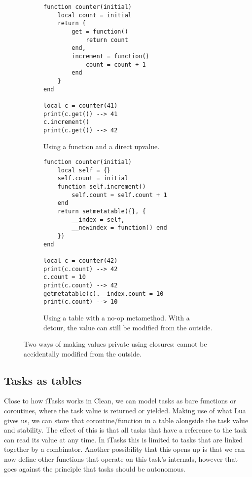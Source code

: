 \begin{figure}[ht]
\centering
\begin{subfigure}{0.40\textwidth}
\begin{verbatim}
function counter(initial)
    local count = initial
    return {
        get = function()
            return count
        end,
        increment = function()
            count = count + 1
        end
    }
end

local c = counter(41)
print(c.get()) --> 41
c.increment()
print(c.get()) --> 42
\end{verbatim}
\caption{Using a  function and a direct  upvalue.}
\label{lst:lua_private_a}
\end{subfigure}
\hspace{0.09\textwidth}
\begin{subfigure}{0.40\textwidth}
\begin{verbatim}
function counter(initial)
    local self = {}
    self.count = initial
    function self.increment()
        self.count = self.count + 1
    end
    return setmetatable({}, {
        __index = self,
        __newindex = function() end
    })
end

local c = counter(42)
print(c.count) --> 42
c.count = 10
print(c.count) --> 42
getmetatable(c).__index.count = 10
print(c.count) --> 10
\end{verbatim}
\caption{Using a table with a no-op  metamethod. With a detour, the value can still be modified from the outside.}
\label{lst:lua_private_b}
\end{subfigure}
\caption{Two ways of making values private using closures:  cannot be accidentally modified from the outside.}
\label{lst:lua_private}
\end{figure}

\subsection{Tasks as tables}
Close to how iTasks works in Clean, we can model tasks as bare functions or coroutines, where the task value is returned or yielded. Making use of what Lua gives us, we can store that coroutine/function in a table alongside the task value and stability. The effect of this is that all tasks that have a reference to the task can read its value at any time. In iTasks this is limited to tasks that are linked together by a combinator. Another possibility that this opens up is that we can now define other functions that operate on this task's internals, however that goes against the principle that tasks should be autonomous.

